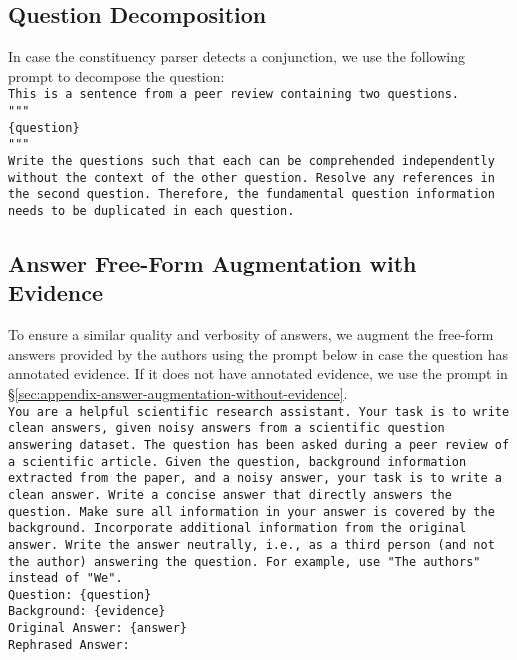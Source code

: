 \subsection{Question Decomposition}\label{sec:appendix-question-processing-decompoistion}
In case the constituency parser detects a conjunction, we use the following prompt to decompose the question:\\
\texttt{This is a sentence from a peer review containing two questions.\\
"""\\
\{question\}\\
"""\\
Write the questions such that each can be comprehended independently without the context of the other question. Resolve any references in the second question. Therefore, the fundamental question information needs to be duplicated in each question.\\
}

\subsection{Answer Free-Form Augmentation with Evidence}\label{sec:appendix-answer-augmentation-with-evidence}
To ensure a similar quality and verbosity of answers, we augment the free-form answers provided by the authors using the prompt below in case the question has annotated evidence. If it does not have annotated evidence, we use the prompt in \S\ref{sec:appendix-answer-augmentation-without-evidence}.\\
\texttt{You are a helpful scientific research assistant. Your task is to write clean answers, given noisy answers from a scientific question answering dataset. The question has been asked during a peer review of a scientific article. Given the question, background information extracted from the paper, and a noisy answer, your task is to write a clean answer. Write a concise answer that directly answers the question. Make sure all information in your answer is covered by the background. Incorporate additional information from the original answer. Write the answer neutrally, i.e., as a third person (and not the author) answering the question. For example, use "The authors" instead of "We".\\
Question: \{question\}\\
Background: \{evidence\}\\
Original Answer: \{answer\}\\
Rephrased Answer:\\
}

